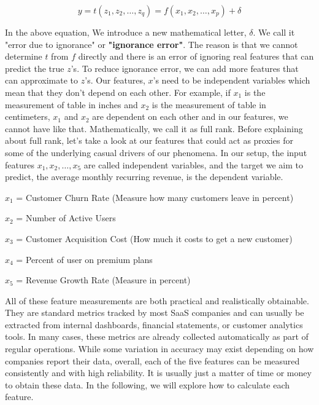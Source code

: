 \documentclass[12pt]{article}
\begin{document}
\[
y = t(z_1, z_2, \dots, z_q) = f(x_1, x_2, \dots, x_p) + \delta 
\]

In the above equation, We introduce a new mathematical letter, $\delta$. We call it "error due to ignorance" or \textbf{"ignorance error"}. The reason is that we cannot determine $t$ from $f$ directly and there is an error of ignoring real features that can predict the true $z$'s. To reduce ignorance error, we can add more features that can approximate to $z$'s. Our features, $x$'s need to be independent variables which mean that they don't depend on each other. For example, if $x_1$ is the measurement of table in inches and $x_2$ is the measurement of table in centimeters, $x_1$ and $x_2$ are dependent on each other and in our features, we cannot have like that. Mathematically, we call it as full rank. Before explaining about full rank, let's take a look at our features that could act as proxies for some of the underlying casual drivers of our phenomena.  In our setup, the input features $x_1, x_2, \ldots, x_5$ are called independent variables, and the target we aim to predict, the average monthly recurring revenue, is the dependent variable.


$x_1$ = Customer Churn Rate (Measure how many customers leave in percent)

$x_2$ = Number of Active Users

$x_3$ = Customer Acquisition Cost (How much it costs to get a new customer)

$x_4$ = Percent of user on premium plans

$x_5$ = Revenue Growth Rate (Measure in percent)

All of these feature measurements are both practical and realistically obtainable. They are standard metrics tracked by most SaaS companies and can usually be extracted from internal dashboards, financial statements, or customer analytics tools. In many cases, these metrics are already collected automatically as part of regular operations. While some variation in accuracy may exist depending on how companies report their data, overall, each of the five features can be measured consistently and with high reliability. It is usually just a matter of time or money to obtain these data. In the following, we will explore how to calculate each feature.
\end{document}
